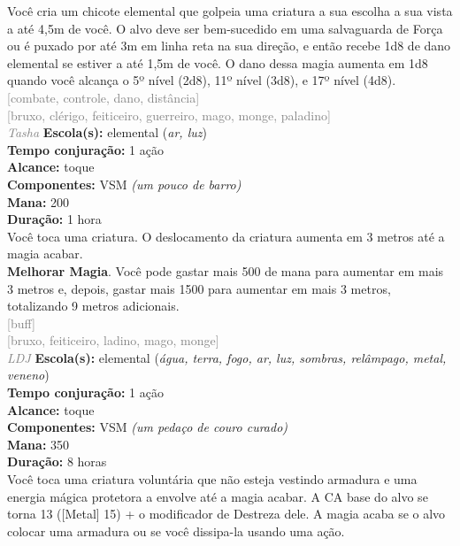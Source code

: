 \documentclass{RPG_Adventure}[2021/10/20]
\begin{document}
{\normalsize Você cria um chicote elemental que golpeia uma criatura a sua escolha a sua vista a até 4,5m de você. O alvo deve ser bem-sucedido em uma salvaguarda de Força ou é puxado por até 3m em linha reta na sua direção, e então recebe 1d8 de dano elemental se estiver a até 1,5m de você.  O dano dessa magia aumenta em 1d8 quando você alcança o 5º nível (2d8), 11º nível (3d8), e 17º nível (4d8).\\}
{\scriptsize \textcolor{gray}{[combate, controle, dano, distância]\\}}
{\scriptsize \textcolor{gray}{[bruxo, clérigo, feiticeiro, guerreiro, mago, monge, paladino]\\}}
{\tiny \textcolor{gray}{\textit{Tasha}}}
{\small \t \textbf{Escola(s):} elemental (\textit{ar, luz})\\\t \textbf{Tempo conjuração:} 1 ação\\\t \textbf{Alcance:} toque\\\t \textbf{Componentes:} VSM \textit{(um pouco de barro)}\\\t \textbf{Mana:} 200\\\t \textbf{Duração:} 1 hora\\}
{\normalsize Você toca uma criatura. O deslocamento da criatura aumenta em 3 metros até a magia acabar.\\\t \textbf{Melhorar Magia}. Você pode gastar mais 500 de mana para aumentar em mais 3 metros e, depois, gastar mais 1500 para aumentar em mais 3 metros, totalizando 9 metros adicionais.\\}
{\scriptsize \textcolor{gray}{[buff]\\}}
{\scriptsize \textcolor{gray}{[bruxo, feiticeiro, ladino, mago, monge]\\}}
{\tiny \textcolor{gray}{\textit{LDJ}}}
{\small \t \textbf{Escola(s):} elemental (\textit{água, terra, fogo, ar, luz, sombras, relâmpago, metal, veneno})\\\t \textbf{Tempo conjuração:} 1 ação\\\t \textbf{Alcance:} toque\\\t \textbf{Componentes:} VSM \textit{(um pedaço de couro curado)}\\\t \textbf{Mana:} 350\\\t \textbf{Duração:} 8 horas\\}
{\normalsize Você toca uma criatura voluntária que não esteja vestindo armadura e uma energia mágica protetora a envolve até a magia acabar. A CA base do alvo se torna 13 ([Metal] 15) + o modificador de Destreza dele. A magia acaba se o alvo colocar uma armadura ou se você dissipa-la usando uma ação.\\}
\end{document}
